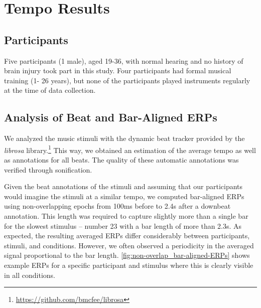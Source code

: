 \section*{Tempo Results}
\subsection*{Participants}
Five participants (1 male), aged 19-36, with normal hearing and no history of brain injury took part in this study. Four participants had formal musical training (1- 26 years), but none of the participants played instruments regularly at the time of data collection.

\subsection*{Analysis of Beat and Bar-Aligned ERPs}

We analyzed the music stimuli with the dynamic beat tracker \cite{Ellis2007beat} provided by the \emph{librosa} library.\footnote{%
\url{https://github.com/bmcfee/librosa}}
This way, we obtained an estimation of the average tempo as well as annotations for all beats. %
The quality of these automatic annotations was verified through sonification.

Given the beat annotations of the stimuli and assuming that our participants would imagine the stimuli at a similar tempo, 
we computed bar-aligned ERPs using non-overlapping epochs from 100ms before to 2.4s after a downbeat annotation.
This length was required to capture slightly more than a single bar for the slowest stimulus -- number 23 with a bar length of more than 2.3s.
As expected, the resulting averaged ERPs differ considerably between participants, stimuli, and conditions.
However, we often observed a periodicity in the averaged signal proportional to the bar length.
%
\autoref{fig:non-overlap_bar-aligned-ERPs} shows example ERPs 
for a specific participant and stimulus where this is clearly visible in all conditions.


